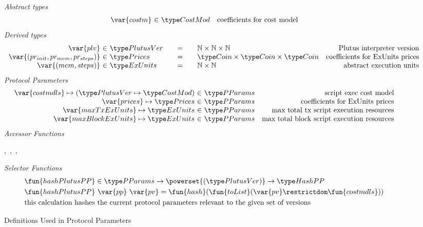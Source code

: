 \begin{figure*}[htb]
  \emph{Abstract types}
  \begin{equation*}
    \begin{array}{r@{~\in~}lr}
      \var{costm} & \CostMod & \text{coefficients for cost model} \\
    \end{array}
  \end{equation*}
  \emph{Derived types}
  \begin{equation*}
    \begin{array}{r@{~\in~}l@{\qquad=\qquad}lr}
      \var{plv} & \PlutusVer
      & \N \times \N \times \N
      & \text{Plutus interpreter version}
      \\
      \var{(pr_{init}, pr_{mem}, pr_{steps})}
      & \Prices
      & \Coin \times \Coin \times \Coin
      & \text {coefficients for ExUnits prices}
      \\
      \var{(mem, steps)}
      & \ExUnits
      & \N \times \N
      & \text{abstract execution units} \\
    \end{array}
  \end{equation*}
  \emph{Protocol Parameters}
  \begin{equation*}
      \begin{array}{r@{~\in~}lr}
        \var{costmdls} \mapsto (\PlutusVer \mapsto \CostMod) & \PParams & \text{script exec cost model}\\
        \var{prices} \mapsto \Prices & \PParams & \text{coefficients for ExUnits prices} \\
        \var{maxTxExUnits} \mapsto \ExUnits & \PParams & \text{max total tx script execution resources}\\
        \var{maxBlockExUnits} \mapsto \ExUnits & \PParams & \text{max total block script execution resources}\\
      \end{array}
  \end{equation*}
  \emph{Accessor Functions}
  \begin{center}
  ,~,~,~
  \end{center}
  \emph{Selector Functions}
  \begin{align*}
    & \fun{hashPlutusPP} \in \PParams \to \powerset{(\PlutusVer)} \to \HashPP   \\
    & \fun{hashPlutusPP}~\var{pp}~\var{pv} = \fun{hash} (\fun{toList} (\var{pv} \restrictdom \fun{costmdls})) \\
    & \text{this calculation hashes the current protocol parameters relevant to
    the given set of versions}
  \end{align*}
  \caption{Definitions Used in Protocol Parameters}
  \label{fig:defs:protocol-parameters}
\end{figure*}


\clearpage
